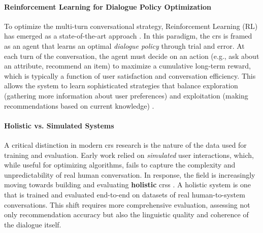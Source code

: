 \paragraph{Reinforcement Learning for Dialogue Policy Optimization}
To optimize the multi-turn conversational strategy, Reinforcement Learning (RL) has emerged as a state-of-the-art approach \cite{SOTA-DIALOGUE-RL}. In this paradigm, the \ac{crs} is framed as an agent that learns an optimal \textit{dialogue policy} through trial and error. At each turn of the conversation, the agent must decide on an action (e.g., ask about an attribute, recommend an item) to maximize a cumulative long-term reward, which is typically a function of user satisfaction and conversation efficiency. This allows the system to learn sophisticated strategies that balance exploration (gathering more information about user preferences) and exploitation (making recommendations based on current knowledge) \cite{SOTA-CR}.

\paragraph{Holistic vs. Simulated Systems}
A critical distinction in modern \ac{crs} research is the nature of the data used for training and evaluation. Early work relied on \textit{simulated} user interactions, which, while useful for optimizing algorithms, fails to capture the complexity and unpredictability of real human conversation. In response, the field is increasingly moving towards building and evaluating \textbf{holistic} \acp{crs} \cite{SURVEY-HOLISTIC-RECSYS}. A holistic system is one that is trained and evaluated end-to-end on datasets of real human-to-system conversations. This shift requires more comprehensive evaluation, assessing not only recommendation accuracy but also the linguistic quality and coherence of the dialogue itself.